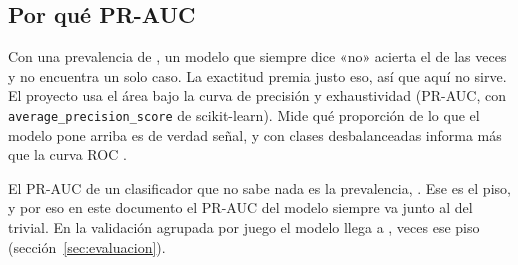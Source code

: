 \subsection{Por qué PR-AUC}\label{sec:objetivo-metrica}

Con una prevalencia de \cifraPrevalenciaEntrenamientoPorResena{}, un modelo que siempre dice «no»
acierta el \cifraExactitudTrivialPorResena{} de las veces y no encuentra un solo caso. La
exactitud premia justo eso, así que aquí no sirve. El proyecto usa el área bajo la curva de
precisión y exhaustividad (PR-AUC, con \texttt{average\_precision\_score} de scikit-learn). Mide
qué proporción de lo que el modelo pone arriba es de verdad señal, y con clases desbalanceadas informa
más que la curva ROC \parencite{saito2015,davis2006}.

El PR-AUC de un clasificador que no sabe nada es la prevalencia, \cifraPRAUCTrivial{}. Ese es el
piso, y por eso en este documento el PR-AUC del modelo siempre va junto al del trivial. En la
validación agrupada por juego el modelo llega a \cifraPRAUCModelo{}, \cifraPRAUCCociente{} veces
ese piso (sección~\ref{sec:evaluacion}).
